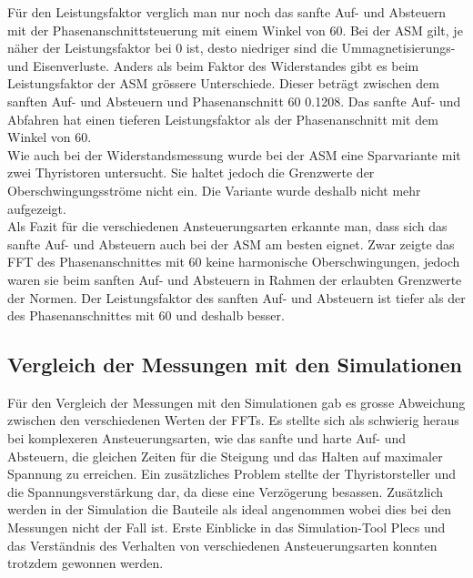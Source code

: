 Für den Leistungsfaktor verglich man nur noch das sanfte Auf- und Absteuern mit der Phasenanschnittsteuerung mit einem Winkel von 60\textdegree \hspace{0.02cm}. Bei der ASM gilt, je näher der Leistungsfaktor bei 0 ist, desto niedriger sind die Ummagnetisierungs- und Eisenverluste. Anders als beim Faktor des Widerstandes gibt es beim Leistungsfaktor der ASM grössere Unterschiede. Dieser beträgt zwischen dem sanften Auf- und Absteuern und Phasenanschnitt 60\textdegree \hspace{0.02cm} 0.1208. Das sanfte Auf- und Abfahren hat einen tieferen Leistungsfaktor als der Phasenanschnitt mit dem Winkel von 60\textdegree. \\

Wie auch bei der Widerstandsmessung wurde bei der ASM eine Sparvariante mit zwei Thyristoren untersucht. Sie haltet jedoch die Grenzwerte der Oberschwingungsströme nicht ein. Die Variante wurde deshalb nicht mehr aufgezeigt.\\

Als Fazit für die verschiedenen Ansteuerungsarten erkannte man, dass sich das sanfte Auf- und Absteuern auch bei der ASM am besten eignet. Zwar zeigte das FFT des Phasenanschnittes mit 60\textdegree \hspace{0.02cm} keine harmonische Oberschwingungen, jedoch waren sie beim sanften Auf- und Absteuern in Rahmen der erlaubten Grenzwerte der Normen. Der Leistungsfaktor des sanften Auf- und Absteuern ist tiefer als der des Phasenanschnittes mit 60\textdegree \hspace{0.02cm} und deshalb besser. 

\subsection{Vergleich der Messungen mit den Simulationen}
Für den Vergleich der Messungen mit den Simulationen gab es grosse Abweichung zwischen den verschiedenen Werten der FFTs. Es stellte sich als schwierig heraus bei komplexeren Ansteuerungsarten, wie das sanfte und harte Auf- und Absteuern, die gleichen Zeiten für die Steigung und das Halten auf maximaler Spannung zu erreichen. Ein zusätzliches Problem stellte der Thyristorsteller und die Spannungsverstärkung dar, da diese eine Verzögerung besassen. Zusätzlich werden in der Simulation die Bauteile als ideal angenommen wobei dies bei den Messungen nicht der Fall ist. Erste Einblicke in das Simulation-Tool Plecs und das Verständnis des Verhalten von verschiedenen Ansteuerungsarten konnten trotzdem gewonnen werden. 







